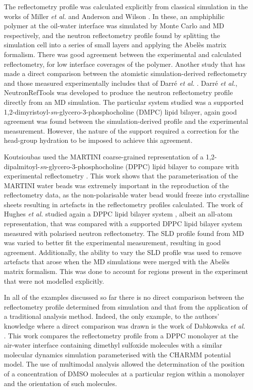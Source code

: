 \documentclass[amsmath,amssymb,twocolumn,superscriptaddress]{revtex4-1}
\begin{document}
The reflectometry profile was calculated explicitly from classical simulation in the works of Miller \emph{et al.} and Anderson and Wilson \cite{miller_monte_2003,anderson_molecular_2004}.
In these, an amphiphilic polymer at the oil-water interface was simulated by Monte Carlo and MD respectively, and the neutron reflectometry profile found by splitting the simulation cell into a series of small layers and applying the Abel\`{e}s matrix formalism.
There was good agreement between the experimental and calculated reflectometry, for low interface coverages of the polymer.
Another study that has made a direct comparison between the atomistic simulation-derived reflectometry and those measured experimentally includes that of Darr\'{e} \emph{et al.} \cite{darre_molecular_2015}.
Darr\'{e} \emph{et al.}, NeutronRefTools was developed to produce the neutron reflectometry profile directly from an MD simulation.
The particular system studied was a supported 1,2-dimyristoyl-\emph{sn}-glycero-3-phosphocholine (DMPC) lipid bilayer, again good agreement was found between the simulation-derived profile and the experimental measurement.
However, the nature of the support required a correction for the head-group hydration to be imposed to achieve this agreement.

Koutsioubas used the MARTINI coarse-grained representation of a 1,2-dipalmitoyl-\emph{sn}-glycero-3-phosphocholine (DPPC) lipid bilayer to compare with experimental reflectometry \cite{koutsioubas_combined_2016}.
This work shows that the parameterisation of the MARTINI water beads was extremely important in the reproduction of the reflectometry data, as the non-polarisable water bead would freeze into crystalline sheets resulting in artefacts in the reflectometry profiles calculated.
The work of Hughes \emph{et al.} studied again a DPPC lipid bilayer system \cite{hughes_interpretation_2016}, albeit an all-atom representation, that was compared with a supported DPPC lipid bilayer system measured with polarised neutron reflectometry.
The SLD profile found from MD was varied to better fit the experimental measurement, resulting in good agreement.
Additionally, the ability to vary the SLD profile was used to remove artefacts that arose when the MD simulations were merged with the Abel\`{e}s matrix formalism.
This was done to account for regions present in the experiment that were not modelled explicitly.

In all of the examples discussed so far there is no direct comparison between the reflectometry profile determined from simulation and that from the application of a traditional analysis method.
Indeed, the only example, to the authors' knowledge where a direct comparison was drawn is the work of Dabkowska \emph{et al.} \cite{dabkowska_modulation_2014}.
This work compares the reflectometry profile from a DPPC monolayer at the air-water interface containing dimethyl sulfoxide molecules with a similar molecular dynamics simulation parameterised with the CHARMM potential model.
The use of multimodal analysis allowed the determination of the position of a concentration of DMSO molecules at a particular region within a monolayer and the orientation of such molecules.
\end{document}
